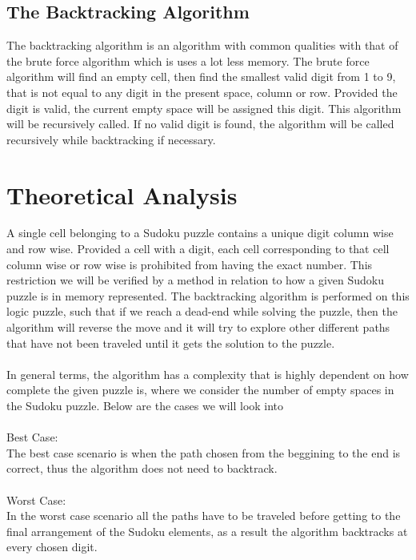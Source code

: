 \documentclass[12pt]{article}
\begin{document}
\subsection{The Backtracking Algorithm}
The backtracking algorithm is an algorithm with common qualities with that of the brute force algorithm which is uses a lot less memory. The brute force algorithm will find an empty cell, then find the smallest valid digit from 1 to 9, that is not equal to any digit in the present space, column or row. Provided the digit is valid, the current empty space will be assigned this digit. This algorithm will be recursively called. If no valid digit is found, the algorithm will be called recursively while backtracking if necessary.

\section{Theoretical Analysis}
A single cell belonging to a Sudoku puzzle contains a unique digit column wise and row wise. Provided a cell with a digit, each cell corresponding to that cell column wise or row wise is prohibited from having the exact number. This restriction we will be verified by a method in relation to how a given Sudoku puzzle is in memory represented. The backtracking algorithm is performed on this logic puzzle, such that if we reach a dead-end while solving the puzzle, then the algorithm will reverse the move and it will try to explore other different paths that have not been traveled until it gets the solution to the puzzle.\\\\
In general terms, the algorithm has a complexity that is highly dependent on how complete the given puzzle is, where we consider the number of empty spaces in the Sudoku puzzle. Below are the cases we will look into\\\\
Best Case:\\
The best case scenario is when the path chosen from the beggining to the end is correct, thus the algorithm does not need to backtrack.\\\\
Worst Case:\\
In the worst case scenario all the paths have to be traveled before getting to the final arrangement of the Sudoku elements, as a result the algorithm backtracks at every chosen digit.
\end{document}
